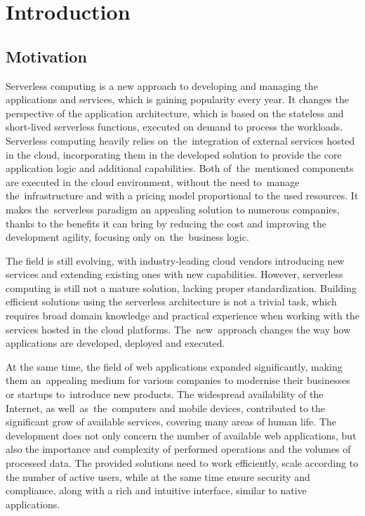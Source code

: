 \chapter{Introduction}

\section{Motivation}

Serverless computing is a new approach to developing and managing the applications and services, which is gaining popularity every year.
It changes the perspective of the application architecture, which is based on the stateless and short-lived serverless functions, executed on demand to process the workloads.
Serverless computing heavily relies on~the~integration of external services hosted in the cloud, incorporating them in the developed solution to provide the core application logic and additional capabilities.
Both of~the~mentioned components are executed in the cloud environment, without the need to~manage the~infrastructure and with a pricing model proportional to the used resources.
It makes the~serverless paradigm an appealing solution to numerous companies, thanks to the benefits it can bring by reducing the cost and improving the development agility, focusing only on~the~business logic.

The field is still evolving, with industry-leading cloud vendors introducing new services and extending existing ones with new capabilities.
However, serverless computing is still not a mature solution, lacking proper standardization.
Building efficient solutions using the serverless architecture is not a trivial task, which requires broad domain knowledge and practical experience when working with the services hosted in the cloud platforms.
The~new~approach changes the way how applications are developed, deployed and executed.

At the same time, the field of web applications expanded significantly, making them an~appealing medium for various companies to modernise their businesses or startups to~introduce new products.
The widespread availability of the Internet, as well~as~the~computers and mobile devices, contributed to the significant grow of available services, covering many areas of human life.
The development does not only concern the number of available web applications, but also the importance and complexity of performed operations and the volumes of processed data.
The provided solutions need to work efficiently, scale according to the number of active users, while at the same time ensure security and compliance, along with a rich and intuitive interface, similar to native applications.

